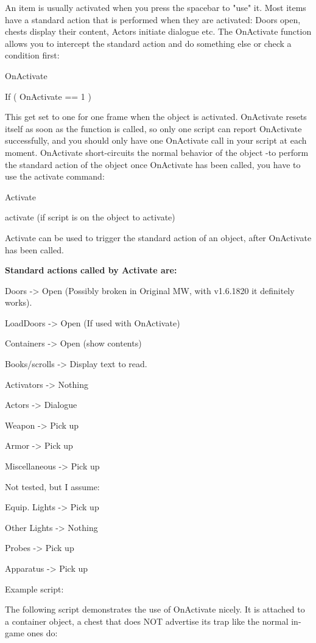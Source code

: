 \documentclass[
]{article}
\begin{document}
An item is usually activated when you press the spacebar to "use" it.
Most items have a standard action that is performed when they are
activated: Doors open, chests display their content, Actors initiate
dialogue etc. The OnActivate function allows you to intercept the
standard action and do something else or check a condition first:

OnActivate

If ( OnActivate == 1 )

This get set to one for one frame when the object is activated.
OnActivate resets itself as soon as the function is called, so only one
script can report OnActivate successfully, and you should only have one
OnActivate call in your script at each moment. OnActivate short-circuits
the normal behavior of the object -to perform the standard action of the
object once OnActivate has been called, you have to use the activate
command:

Activate

activate (if script is on the object to activate)

Activate can be used to trigger the standard action of an object, after
OnActivate has been called.

\textbf{Standard actions called by Activate are:}

Doors -\textgreater{} Open (Possibly broken in Original MW, with
v1.6.1820 it definitely works).

LoadDoors -\textgreater{} Open (If used with OnActivate)

Containers -\textgreater{} Open (show contents)

Books/scrolls -\textgreater{} Display text to read.

Activators -\textgreater{} Nothing

Actors -\textgreater{} Dialogue

Weapon -\textgreater{} Pick up

Armor -\textgreater{} Pick up

Miscellaneous -\textgreater{} Pick up

Not tested, but I assume:

Equip. Lights -\textgreater{} Pick up

Other Lights -\textgreater{} Nothing

Probes -\textgreater{} Pick up

Apparatus -\textgreater{} Pick up

Example script:

The following script demonstrates the use of OnActivate nicely. It is
attached to a container object, a chest that does NOT advertise its trap
like the normal in-game ones do:
\end{document}
